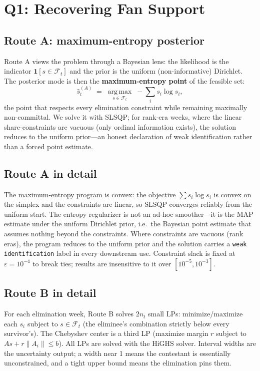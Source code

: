 \documentclass[12pt]{article}
\begin{document}
\section{Q1: Recovering Fan Support}
\label{sec:q1}

\subsection{Route A: maximum-entropy posterior}
Route A views the problem through a Bayesian lens: the likelihood is the indicator
$\mathbf{1}[s \in \mathcal{F}_t]$ and the prior is the uniform (non-informative)
Dirichlet. The posterior mode is then the \textbf{maximum-entropy point} of the
feasible set:
\begin{equation}
\hat{s}^{(A)}_t \;=\; \operatorname*{arg\,max}_{s \in \mathcal{F}_t}\;
-\sum_{i} s_i \log s_i,
\end{equation}
the point that respects every elimination constraint while remaining maximally
non-committal. We solve it with SLSQP; for rank-era weeks, where the linear
share-constraints are vacuous (only ordinal information exists), the solution
reduces to the uniform prior---an honest declaration of weak identification rather
than a forced point estimate.

\subsection*{Route A in detail}
The maximum-entropy program is convex: the objective $\sum s_i \log s_i$ is convex
on the simplex and the constraints are linear, so SLSQP converges reliably from the
uniform start. The entropy regularizer is not an ad-hoc smoother---it is the MAP
estimate under the uniform Dirichlet prior, i.e.\ the Bayesian point estimate that
assumes nothing beyond the constraints. Where constraints are vacuous (rank eras),
the program reduces to the uniform prior and the solution carries a \texttt{weak
identification} label in every downstream use. Constraint slack is fixed at
$\varepsilon = 10^{-4}$ to break ties; results are insensitive to it over
$[10^{-5}, 10^{-3}]$.

\subsection*{Route B in detail}
For each elimination week, Route B solves $2n_t$ small LPs: minimize/maximize each
$s_i$ subject to $s \in \mathcal{F}_t$ (the eliminee's combination strictly below
every survivor's). The Chebyshev center is a third LP (maximize margin $r$ subject to
$A s + r\|A_i\| \le b$). All LPs are solved with the HiGHS solver. Interval widths
are the uncertainty output; a width near 1 means the contestant is essentially
unconstrained, and a tight upper bound means the elimination pins them.
\end{document}
